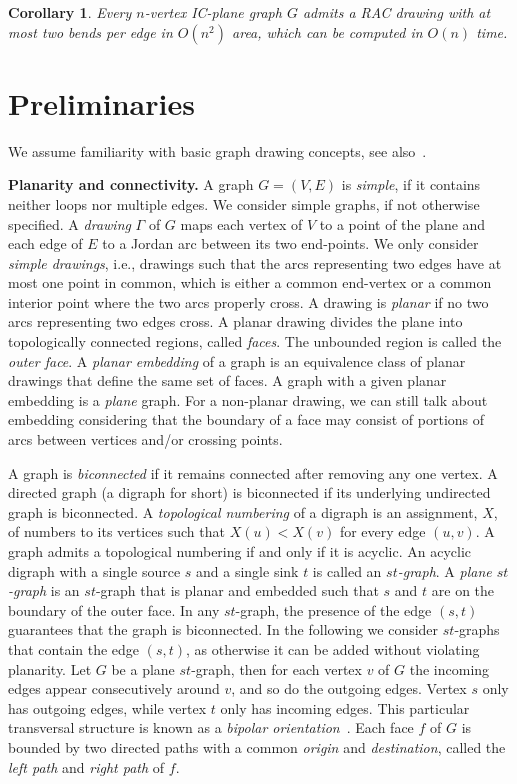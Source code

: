 \documentclass[a4paper]{article}
\newtheorem{corollary}{Corollary}
\begin{document}
\begin{corollary}\label{co:main}
Every $n$-vertex IC-plane graph $G$ admits a RAC drawing with at most two bends per edge in $O(n^2)$ area, which can be computed in $O(n)$ time.
\end{corollary}




\section{Preliminaries}\label{se:preliminaries}
We assume familiarity with basic graph drawing concepts, see also~\cite{dett-gd-99}. 

{\bf Planarity and connectivity.} A graph $G=(V,E)$ is \emph{simple}, if it contains neither loops nor multiple edges. We consider simple graphs, if not otherwise specified. A \emph{drawing} $\Gamma$ of $G$ maps each vertex of $V$ to a point of the plane and each edge of $E$ to a Jordan arc between its two end-points. We only consider \emph{simple drawings}, i.e., drawings such that the arcs representing two edges have at most one point in common, which is either a common end-vertex or a common interior point where the two arcs properly cross. A drawing is \emph{planar} if no two arcs representing two edges cross. A planar drawing divides the plane into topologically connected regions, called \emph{faces}. The unbounded region is called the \emph{outer face}. A \emph{planar embedding} of a graph is an equivalence class of planar drawings that define the same set of faces. A graph with a given planar embedding is a \emph{plane} graph. For a non-planar drawing, we can still talk about embedding considering that the boundary of a face may consist of portions of arcs between vertices and/or crossing points. 

A graph is \emph{biconnected} if it remains connected after removing any one vertex. A directed graph (a digraph for short) is biconnected if its underlying undirected graph is biconnected. A \emph{topological numbering} of a digraph is an assignment, $X$, of numbers to its vertices such that $X(u) < X(v)$ for every edge $(u,v)$. A graph admits a topological numbering if and only if it is acyclic. An acyclic digraph with a single source $s$ and a single sink $t$ is called an \emph{$st$-graph}. A \emph{plane $st$-graph} is an $st$-graph that is planar and embedded such that $s$ and $t$ are on the boundary of the outer face. In any $st$-graph, the presence of the edge $(s,t)$ guarantees that the graph is biconnected. In the following we consider $st$-graphs that contain the edge $(s,t)$, as otherwise it can be added without violating planarity. Let $G$ be a plane $st$-graph, then for each vertex $v$ of $G$ the incoming edges appear consecutively around $v$, and so do the outgoing edges. Vertex $s$ only has outgoing edges, while vertex $t$ only has incoming edges. This particular transversal structure is known as a \emph{bipolar orientation}~\cite{DBLP:journals/dcg/RosenstiehlT86,TamassiaTollis86}. Each face $f$ of $G$ is bounded by two directed paths with a common \emph{origin} and \emph{destination}, called the \emph{left path} and \emph{right path} of $f$. 
\end{document}
